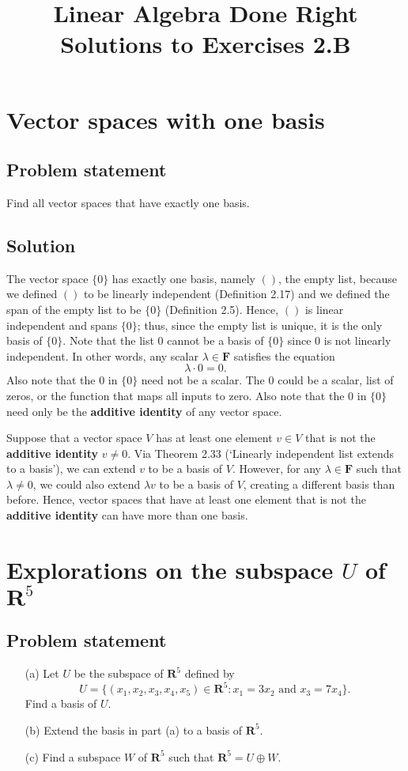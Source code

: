 \documentclass{article}
\title{Linear Algebra Done Right\\Solutions to Exercises 2.B}
\author{}
\date{}
\begin{document}
\maketitle

\section{Vector spaces with one basis}
\subsection*{Problem statement}
Find all vector spaces that have exactly one basis.

\subsection*{Solution}
The vector space $\{0\}$ has exactly one basis, namely $()$, the empty list, because we defined $()$ to be linearly independent (Definition 2.17) and we defined the span of the empty list to be $\{0\}$ (Definition 2.5). 
Hence, $()$ is linear independent and spans $\{0\}$; thus, since the empty list is unique, it is the only basis of $\{0\}$.
Note that the list $0$ cannot be a basis of $\{0\}$ since $0$ is not linearly independent. 
In other words, any scalar $\lambda\in\mathbf{F}$ satisfies the equation
\[\lambda\cdot0=0.\]
Also note that the $0$ in $\{0\}$ need not be a scalar. 
The $0$ could be a scalar, list of zeros, or the function that maps all inputs to zero. 
Also note that the $0$ in $\{0\}$ need only be the \textbf{additive identity} of any vector space.

Suppose that a vector space $V$ has at least one element $v\in V$ that is not the \textbf{additive identity} $v\neq0$. 
Via Theorem 2.33 (`Linearly independent list extends to a basis'), we can extend $v$ to be a basis of $V$. 
However, for any $\lambda\in\mathbf{F}$ such that $\lambda\neq 0$, we could also extend $\lambda v$ to be a basis of $V$, creating a different basis than before. 
Hence, vector spaces that have at least one element that is not the \textbf{additive identity} can have more than one basis.

\clearpage

\section{Explorations on the subspace $U$ of $\mathbf{R}^5$}
\subsection*{Problem statement}
\begin{enumerate}
    \item[(a)] Let $U$ be the subspace of $\mathbf{R}^5$ defined by \[U=\{(x_1,x_2,x_3,x_4,x_5)\in\mathbf{R}^5:x_1=3x_2\text{ and }x_3=7x_4\}.\] Find a basis of $U$.
    \item[(b)] Extend the basis in part (a) to a basis of $\mathbf{R}^5$.
    \item[(c)] Find a subspace $W$ of $\mathbf{R}^5$ such that $\mathbf{R}^5=U\oplus W$.
\end{enumerate}
\end{document}
